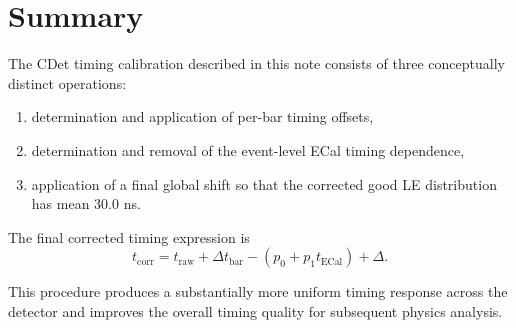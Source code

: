 \documentclass[11pt]{article}
\begin{document}
\section{Summary}

The CDet timing calibration described in this note consists of three conceptually distinct operations:

\begin{enumerate}
    \item determination and application of per-bar timing offsets,
    \item determination and removal of the event-level ECal timing dependence,
    \item application of a final global shift so that the corrected good LE distribution has mean 30.0 ns.
\end{enumerate}

The final corrected timing expression is
\[
t_{\mathrm{corr}}
=
t_{\mathrm{raw}}
+ \Delta t_{\mathrm{bar}}
- (p_0 + p_1 t_{\mathrm{ECal}})
+ \Delta.
\]

This procedure produces a substantially more uniform timing response across the detector and improves the overall timing quality for subsequent physics analysis.
\end{document}

